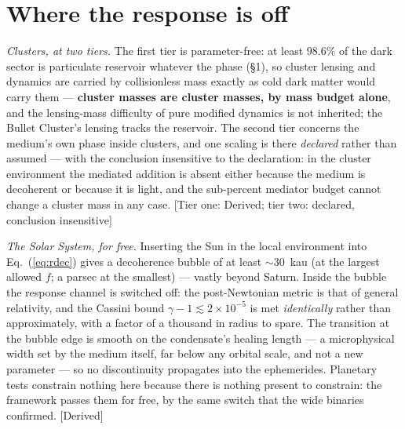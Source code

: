 \section{Where the response is off}
\emph{Clusters, at two tiers.} The first tier is parameter-free: at least $98.6\%$ of the dark sector is particulate reservoir whatever the phase (\S1), so cluster lensing and dynamics are carried by collisionless mass exactly as cold dark matter would carry them --- \textbf{cluster masses are cluster masses, by mass budget alone}, and the lensing-mass difficulty of pure modified dynamics is not inherited; the Bullet Cluster's lensing tracks the reservoir. The second tier concerns the medium's own phase inside clusters, and one scaling is there \emph{declared} rather than assumed --- with the conclusion insensitive to the declaration: in the cluster environment the mediated addition is absent either because the medium is decoherent or because it is light, and the sub-percent mediator budget cannot change a cluster mass in any case. [Tier one: Derived; tier two: declared, conclusion insensitive]

\emph{The Solar System, for free.} Inserting the Sun in the local environment into Eq.~(\ref{eq:rdec}) gives a decoherence bubble of at least $\sim$30~kau (at the largest allowed $f$; a parsec at the smallest) --- vastly beyond Saturn. Inside the bubble the response channel is switched off: the post-Newtonian metric is that of general relativity, and the Cassini bound $\gamma-1\lesssim2\times10^{-5}$ is met \emph{identically} rather than approximately, with a factor of a thousand in radius to spare. The transition at the bubble edge is smooth on the condensate's healing length --- a microphysical width set by the medium itself, far below any orbital scale, and not a new parameter --- so no discontinuity propagates into the ephemerides. Planetary tests constrain nothing here because there is nothing present to constrain: the framework passes them for free, by the same switch that the wide binaries confirmed. [Derived]

